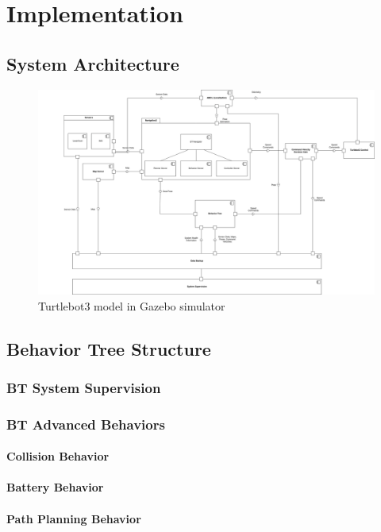 \chapter{Implementation}
\label{cha:implementierung}

\section{System Architecture}
\begin{figure}
	\includegraphics[width=1.0\textwidth]{images/component_diagram_bt_architecture.png}
	\caption{Turtlebot3 model in Gazebo simulator}
\end{figure}

\section{Behavior Tree Structure}

\subsection{BT System Supervision}

\subsection{BT Advanced Behaviors}

\subsubsection{Collision Behavior}

\subsubsection{Battery Behavior}

\subsubsection{Path Planning Behavior}







